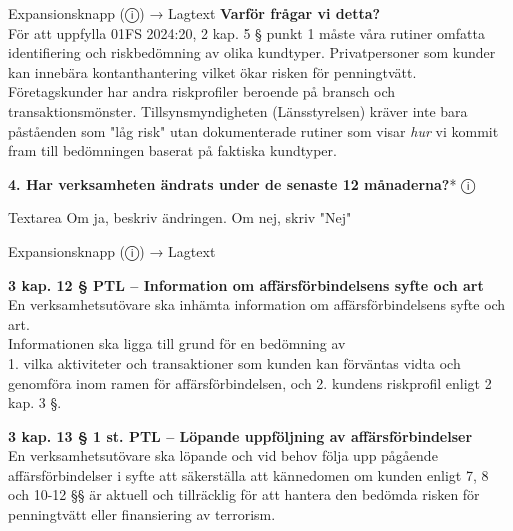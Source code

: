 \documentclass[10pt]{beamer}
\begin{document}
\begin{frame}[label=riskfragor-steg1]
\begin{alertblock}{Expansionsknapp (ⓘ) → Lagtext}
    \tiny \textbf{Varför frågar vi detta?}\\
    \tiny För att uppfylla 01FS 2024:20, 2 kap. 5 § punkt 1 måste våra rutiner omfatta 
    identifiering och riskbedömning av olika kundtyper. Privatpersoner som kunder kan 
    innebära kontanthantering vilket ökar risken för penningtvätt. Företagskunder har 
    andra riskprofiler beroende på bransch och transaktionsmönster. Tillsynsmyndigheten 
    (Länsstyrelsen) kräver inte bara påståenden som "låg risk" utan dokumenterade rutiner 
    som visar \textit{hur} vi kommit fram till bedömningen baserat på faktiska kundtyper.
  \end{alertblock}

  \vspace{0.2cm}

  \textbf{4. Har verksamheten ändrats under de senaste 12 månaderna?}* \hspace{0.3cm} ⓘ
  \begin{block}{Textarea}
    \tiny Om ja, beskriv ändringen. Om nej, skriv "Nej"
  \end{block}
  \begin{alertblock}{Expansionsknapp (ⓘ) → Lagtext}

    \tiny \textbf{3 kap. 12 § PTL – Information om affärsförbindelsens syfte och art}\\
    \tiny En verksamhetsutövare ska inhämta information om affärsförbindelsens syfte och art.\\

    \tiny Informationen ska ligga till grund för en bedömning av\\
    \tiny 1. vilka aktiviteter och transaktioner som kunden kan förväntas vidta och genomföra inom ramen för affärsförbindelsen, och
    \tiny 2. kundens riskprofil enligt 2 kap. 3 §.
    \vspace{0.1cm}

    \tiny \textbf{3 kap. 13 § 1 st. PTL – Löpande uppföljning av affärsförbindelser}\\
    \tiny En verksamhetsutövare ska löpande och vid behov följa upp pågående affärsförbindelser
     i syfte att säkerställa att kännedomen om kunden enligt 7, 8 och 10-12 §§ är aktuell och 
     tillräcklig för att hantera den bedömda risken för penningtvätt eller finansiering av terrorism.\\[0.1cm]
    

\end{alertblock}
\end{frame}
\end{document}
